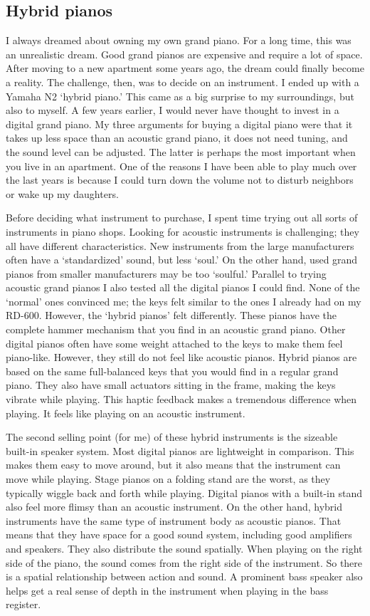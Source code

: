 \subsection{Hybrid pianos}

I always dreamed about owning my own grand piano. For a long time, this was an unrealistic dream. Good grand pianos are expensive and require a lot of space. After moving to a new apartment some years ago, the dream could finally become a reality. The challenge, then, was to decide on an instrument. I ended up with a Yamaha N2 `hybrid piano.' This came as a big surprise to my surroundings, but also to myself. A few years earlier, I would never have thought to invest in a digital grand piano.
My three arguments for buying a digital piano were that it takes up less space than an acoustic grand piano, it does not need tuning, and the sound level can be adjusted. The latter is perhaps the most important when you live in an apartment. One of the reasons I have been able to play much over the last years is because I could turn down the volume not to disturb neighbors or wake up my daughters.

Before deciding what instrument to purchase, I spent time trying out all sorts of instruments in piano shops. Looking for acoustic instruments is challenging; they all have different characteristics. New instruments from the large manufacturers often have a `standardized' sound, but less `soul.' On the other hand, used grand pianos from smaller manufacturers may be too `soulful.' Parallel to trying acoustic grand pianos I also tested all the digital pianos I could find. None of the `normal' ones convinced me; the keys felt similar to the ones I already had on my RD-600. However, the `hybrid pianos' felt differently. These pianos have the complete hammer mechanism that you find in an acoustic grand piano. Other digital pianos often have some weight attached to the keys to make them feel piano-like. However, they still do not feel like acoustic pianos. Hybrid pianos are based on the same full-balanced keys that you would find in a regular grand piano. They also have small actuators sitting in the frame, making the keys vibrate while playing. This haptic feedback makes a tremendous difference when playing. It feels like playing on an acoustic instrument.

The second selling point (for me) of these hybrid instruments is the sizeable built-in speaker system. Most digital pianos are lightweight in comparison. This makes them easy to move around, but it also means that the instrument can move while playing. Stage pianos on a folding stand are the worst, as they typically wiggle back and forth while playing. Digital pianos with a built-in stand also feel more flimsy than an acoustic instrument. On the other hand, hybrid instruments have the same type of instrument body as acoustic pianos. That means that they have space for a good sound system, including good amplifiers and speakers. They also distribute the sound spatially. When playing on the right side of the piano, the sound comes from the right side of the instrument. So there is a spatial relationship between action and sound. A prominent bass speaker also helps get a real sense of depth in the instrument when playing in the bass register.

